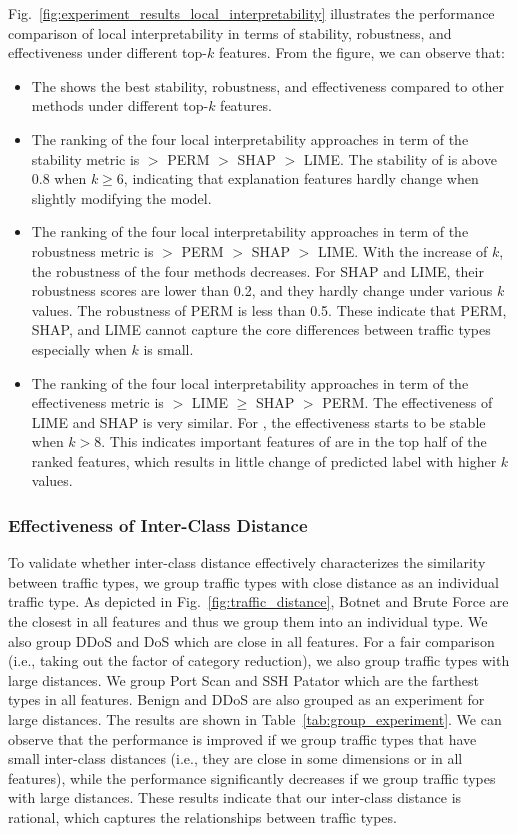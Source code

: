 Fig.~\ref{fig:experiment_results_local_interpretability} illustrates the performance comparison of local interpretability in terms of stability, robustness, and effectiveness under different top-$k$ features. 
From the figure, we can observe that:
\begin{itemize}
\item The \sys shows the best stability, robustness, and effectiveness compared to other methods under different top-$k$ features. 
\item The ranking of the four local interpretability approaches in term of the stability metric is \sys $>$ PERM $>$ SHAP $>$ LIME. The stability of \sys is above 0.8 when $k \ge 6$, indicating that explanation features hardly change when slightly modifying the model. 
\item The ranking of the four local interpretability approaches in term of the robustness metric is \sys $>$ PERM $>$ SHAP $>$ LIME. With the increase of $k$, the robustness of the four methods decreases. For SHAP and LIME, their robustness scores are lower than 0.2, and they hardly change under various $k$ values. The robustness of PERM is less than 0.5. These indicate that PERM, SHAP, and LIME cannot capture the core differences between traffic types especially when $k$ is small.
\item The ranking of the four local interpretability approaches in term of the effectiveness metric is \sys $>$ LIME $\ge$ SHAP $>$ PERM. The effectiveness of LIME and SHAP is very similar. For \sys, the effectiveness starts to be stable when $k > 8$. This indicates important features of \sys are in the top half of the ranked features, which results in little change of predicted label with higher $k$ values.
\end{itemize}

\subsubsection{Effectiveness of Inter-Class Distance}\label{sec:group}
To validate whether inter-class distance effectively characterizes the similarity between traffic types, we group traffic types with close distance as an individual traffic type. 
As depicted in Fig.~\ref{fig:traffic_distance}, Botnet and Brute Force are the closest in all features and thus we group them into an individual type. 
We also group DDoS and DoS which are close in all features. 
For a fair comparison (i.e., taking out the factor of category reduction), we also group traffic types with large distances. 
We group Port Scan and SSH Patator which are the farthest types in all features. 
Benign and DDoS are also grouped as an experiment for large distances. 
The results are shown in Table~\ref{tab:group_experiment}. 
We can observe that the performance is improved if we group traffic types that have small inter-class distances (i.e., they are close in some dimensions or in all features), while the performance significantly decreases if we group traffic types with large distances. 
These results indicate that our inter-class distance is rational, which captures the relationships between traffic types. 

